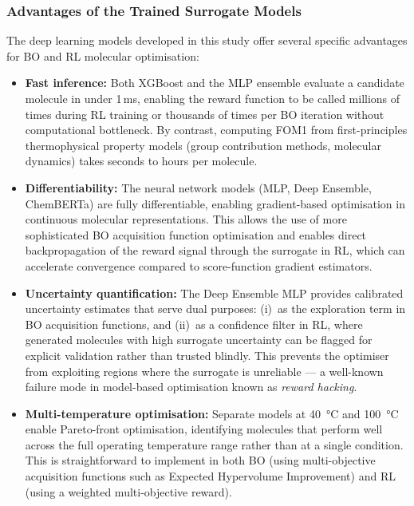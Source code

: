\documentclass[11pt,a4paper]{article}
\begin{document}
\subsubsection{Advantages of the Trained Surrogate Models}

The deep learning models developed in this study offer several specific advantages for BO and RL molecular optimisation:

\begin{itemize}
    \item \textbf{Fast inference:} Both XGBoost and the MLP ensemble evaluate a candidate molecule in under 1\,ms, enabling the reward function to be called millions of times during RL training or thousands of times per BO iteration without computational bottleneck. By contrast, computing FOM1 from first-principles thermophysical property models (group contribution methods, molecular dynamics) takes seconds to hours per molecule.

    \item \textbf{Differentiability:} The neural network models (MLP, Deep Ensemble, ChemBERTa) are fully differentiable, enabling gradient-based optimisation in continuous molecular representations. This allows the use of more sophisticated BO acquisition function optimisation and enables direct backpropagation of the reward signal through the surrogate in RL, which can accelerate convergence compared to score-function gradient estimators.

    \item \textbf{Uncertainty quantification:} The Deep Ensemble MLP provides calibrated uncertainty estimates that serve dual purposes: (i)~as the exploration term in BO acquisition functions, and (ii)~as a confidence filter in RL, where generated molecules with high surrogate uncertainty can be flagged for explicit validation rather than trusted blindly. This prevents the optimiser from exploiting regions where the surrogate is unreliable --- a well-known failure mode in model-based optimisation known as \emph{reward hacking}.

    \item \textbf{Multi-temperature optimisation:} Separate models at \SI{40}{\degreeCelsius} and \SI{100}{\degreeCelsius} enable Pareto-front optimisation, identifying molecules that perform well across the full operating temperature range rather than at a single condition. This is straightforward to implement in both BO (using multi-objective acquisition functions such as Expected Hypervolume Improvement) and RL (using a weighted multi-objective reward).
\end{itemize}
\end{document}
